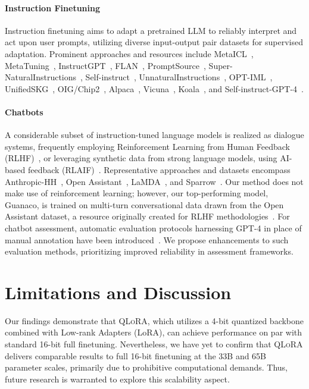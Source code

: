 \paragraph{Instruction Finetuning} Instruction finetuning aims to adapt a pretrained LLM to reliably interpret and act upon user prompts, utilizing diverse input-output pair datasets for supervised adaptation. Prominent approaches and resources include MetaICL~\citep{min2021metaicl}, MetaTuning~\citep{zhong2021adapting}, InstructGPT~\citep{ouyang2022training}, FLAN~\citep{wei2021finetuned,chung2022scaling}, PromptSource~\citep{bach2022promptsource}, Super-NaturalInstructions~\citep{wang2022super,sanh2021multitask}, Self-instruct~\citep{wang2022self}, UnnaturalInstructions~\citep{honovich2022unnatural}, OPT-IML~\citep{iyer2022opt}, UnifiedSKG~\citep{xie2022unifiedskg}, OIG/Chip2~\citep{laion2023}, Alpaca~\citep{alpaca}, Vicuna~\citep{vicuna2023}, Koala~\citep{koala_blogpost_2023}, and Self-instruct-GPT-4~\citep{peng2023instruction}.

\paragraph{Chatbots} A considerable subset of instruction-tuned language models is realized as dialogue systems, frequently employing Reinforcement Learning from Human Feedback (RLHF)~\citep{christiano2017deep}, or leveraging synthetic data from strong language models, using AI-based feedback (RLAIF)~\citep{bai2022constitutional}. Representative approaches and datasets encompass Anthropic-HH~\citep{askell2021general,bai2022training}, Open Assistant~\citep{kopf2023openassistant}, LaMDA~\citep{thoppilan2022lamda}, and Sparrow~\citep{glaese2022improving}. Our method does not make use of reinforcement learning; however, our top-performing model, Guanaco, is trained on multi-turn conversational data drawn from the Open Assistant dataset, a resource originally created for RLHF methodologies~\citep{kopf2023openassistant}. For chatbot assessment, automatic evaluation protocols harnessing GPT-4 in place of manual annotation have been introduced~\citep{vicuna2023,peng2023instruction}. We propose enhancements to such evaluation methods, prioritizing improved reliability in assessment frameworks.

\section{Limitations and Discussion}

Our findings demonstrate that \textsc{QLoRA}, which utilizes a 4-bit quantized backbone combined with Low-rank Adapters (LoRA), can achieve performance on par with standard 16-bit full finetuning. Nevertheless, we have yet to confirm that \textsc{QLoRA} delivers comparable results to full 16-bit finetuning at the 33B and 65B parameter scales, primarily due to prohibitive computational demands. Thus, future research is warranted to explore this scalability aspect. 

